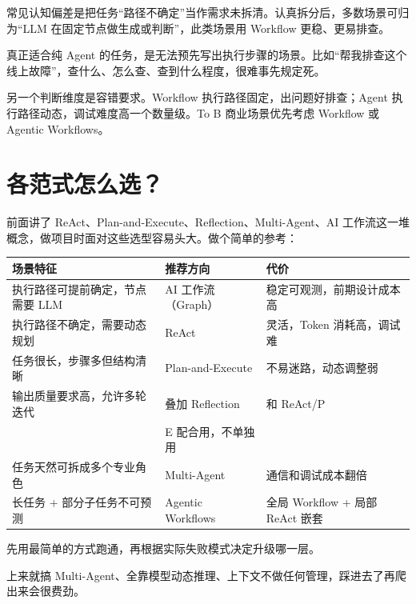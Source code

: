 \documentclass[9pt,a4paper,twocolumn]{ctexart}
\begin{document}
常见认知偏差是把任务“路径不确定”当作需求未拆清。认真拆分后，多数场景可归为“LLM 在固定节点做生成或判断”，此类场景用 Workflow 更稳、更易排查。



真正适合纯 Agent 的任务，是无法预先写出执行步骤的场景。比如“帮我排查这个线上故障”，查什么、怎么查、查到什么程度，很难事先规定死。



另一个判断维度是容错要求。Workflow 执行路径固定，出问题好排查；Agent 执行路径动态，调试难度高一个数量级。To B 商业场景优先考虑 Workflow 或 Agentic Workflows。



\section*{各范式怎么选？}


前面讲了 ReAct、Plan-and-Execute、Reflection、Multi-Agent、AI 工作流这一堆概念，做项目时面对这些选型容易头大。做个简单的参考：


{\footnotesize
\begin{tabular}{|p{}|p{}|p{}|}
\hline
\textbf{场景特征} & \textbf{推荐方向} & \textbf{代价} \\
\hline
执行路径可提前确定，节点需要 LLM & AI 工作流（Graph） & 稳定可观测，前期设计成本高 \\
\hline
执行路径不确定，需要动态规划 & ReAct & 灵活，Token 消耗高，调试难 \\
\hline
任务很长，步骤多但结构清晰 & Plan-and-Execute & 不易迷路，动态调整弱 \\
\hline
输出质量要求高，允许多轮迭代 & 叠加 Reflection & 和 ReAct/P\\&E 配合用，不单独用 \\
\hline
任务天然可拆成多个专业角色 & Multi-Agent & 通信和调试成本翻倍 \\
\hline
长任务 + 部分子任务不可预测 & Agentic Workflows & 全局 Workflow + 局部 ReAct 嵌套 \\
\hline
\end{tabular}
}



先用最简单的方式跑通，再根据实际失败模式决定升级哪一层。



上来就搞 Multi-Agent、全靠模型动态推理、上下文不做任何管理，踩进去了再爬出来会很费劲。
\end{document}
